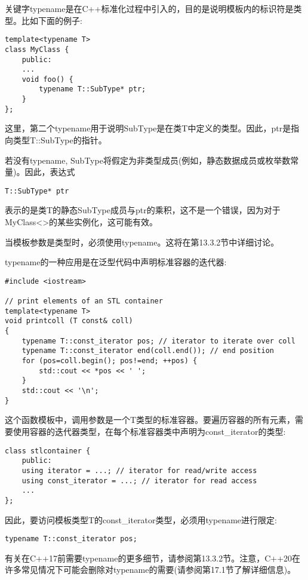 关键字typename是在C++标准化过程中引入的，目的是说明模板内的标识符是类型。比如下面的例子:

\begin{lstlisting}[style=styleCXX]
template<typename T>
class MyClass {
	public:
	...
	void foo() {
		typename T::SubType* ptr;
	}
};
\end{lstlisting}

这里，第二个typename用于说明SubType是在类T中定义的类型。因此，ptr是指向类型T::SubType的指针。

若没有typename, SubType将假定为非类型成员(例如，静态数据成员或枚举数常量)。因此，表达式

\begin{lstlisting}[style=styleCXX]
T::SubType* ptr
\end{lstlisting}

表示的是类T的静态SubType成员与ptr的乘积，这不是一个错误，因为对于MyClass<>的某些实例化，这可能有效。

当模板参数是类型时，必须使用typename。这将在第13.3.2节中详细讨论。

typename的一种应用是在泛型代码中声明标准容器的迭代器:

\begin{lstlisting}[style=styleCXX]
#include <iostream>

// print elements of an STL container
template<typename T>
void printcoll (T const& coll)
{
	typename T::const_iterator pos; // iterator to iterate over coll
	typename T::const_iterator end(coll.end()); // end position
	for (pos=coll.begin(); pos!=end; ++pos) {
		std::cout << *pos << ' ';
	}
	std::cout << '\n';
}
\end{lstlisting}

这个函数模板中，调用参数是一个T类型的标准容器。要遍历容器的所有元素，需要使用容器的迭代器类型，在每个标准容器类中声明为const\_iterator的类型:

\begin{lstlisting}[style=styleCXX]
class stlcontainer {
	public:
	using iterator = ...; // iterator for read/write access
	using const_iterator = ...; // iterator for read access
	...
};
\end{lstlisting}

因此，要访问模板类型T的const\_iterator类型，必须用typename进行限定:

\begin{lstlisting}[style=styleCXX]
typename T::const_iterator pos;
\end{lstlisting}

有关在C++17前需要typename的更多细节，请参阅第13.3.2节。注意，C++20在许多常见情况下可能会删除对typename的需要(请参阅第17.1节了解详细信息)。












